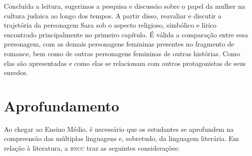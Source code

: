 \documentclass[12pt]{extarticle}
\begin{document}

Concluída a leitura, sugerimos a pesquisa e discussão sobre
o papel da mulher na cultura judaica ao longo dos tempos. A partir
disso, reavaliar e discutir a trajetória da personagem Sara sob o
aspecto religioso, simbólico e lírico encontrado principalmente no
primeiro capítulo. É válida a comparação entre essa personagem, com as
demais personagens femininas presentes no fragmento de romance, bem como
de outras personagens femininas de outras histórias. Como elas são
apresentadas e como elas se relacionam com outros protagonistas de seus
enredos.

\section{Aprofundamento}

Ao chegar ao Ensino Médio, é necessário que os estudantes se aprofundem
na compreensão das múltiplas linguagens e, sobretudo, da linguagem
literária. Em relação à literatura, a \textsc{bncc} traz as seguintes
considerações:
\end{document}
